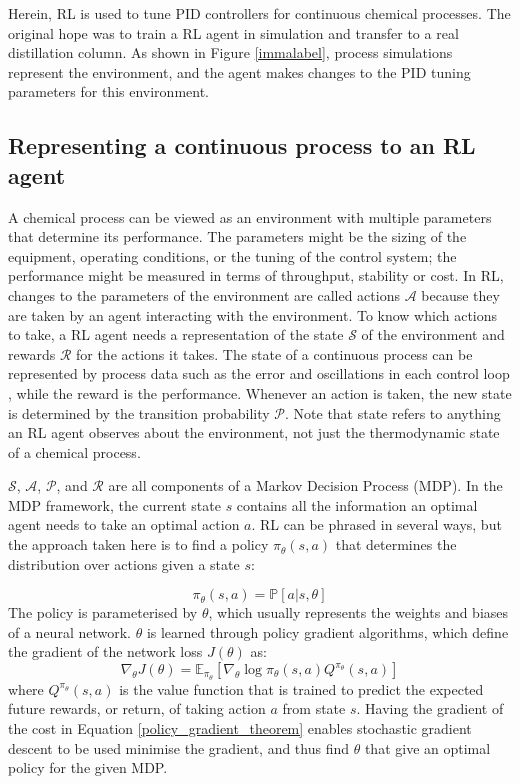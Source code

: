Herein, RL is used to tune PID controllers for continuous chemical processes. The original hope was to train a RL agent in simulation and transfer to a real distillation column. As shown in Figure \ref{immalabel}, process simulations represent the environment, and the agent makes changes to the PID tuning parameters for this environment. 

\subsection{Representing a continuous process to an RL agent}
A chemical process can be viewed as an environment with multiple parameters that determine its performance. The parameters might be the sizing of the equipment, operating conditions, or the tuning of the control system; the performance might be measured in terms of throughput, stability or cost. In RL, changes to the parameters of the environment are called actions $\mathcal A$ because they are taken by an agent interacting with the environment. To know which actions to take, a RL agent needs a representation of the state $\mathcal S$ of the environment and rewards $\mathcal R$ for the actions it takes. The state of a continuous process can be represented by process data such as the error and oscillations in each control loop \cite{Lee2005, Badgwell2019, Shin2019}, while the reward is the performance. Whenever an action is taken, the new state is determined by the transition probability $\mathcal P$. Note that state refers to anything an RL agent observes about the environment, not just the thermodynamic state of a chemical process.

$\mathcal S$, $\mathcal A$, $\mathcal P$, and $\mathcal R$ are all components of a Markov Decision Process (MDP). In the MDP framework, the current state $s$ contains all the information an optimal agent needs to take an optimal action $a$.  RL can be phrased in several ways, but the approach taken here is to find a policy $\pi_{\theta}(s,a)$ that determines the distribution over actions given a state $s$:

\begin{equation}
	\pi_{\theta}(s,a) = \mathbb P[a|s,\theta]
\end{equation}
The policy is parameterised by $\theta$, which usually represents the weights and biases of a neural network. $\theta$ is learned through policy gradient algorithms, which define the gradient of the network loss $J(\theta)$ as:
\begin{equation}
	\label{policy_gradient_theorem}
	\nabla_{\theta}J(\theta) = \mathbb E_{\pi_{\theta}} [\nabla_{\theta} \log \pi_\theta(s,a)Q^{\pi_{\theta}}(s,a)]
\end{equation}
where $Q^{\pi_{\theta}}(s,a)$ is the value function that is trained to predict the expected future rewards, or return, of taking action $a$ from state $s$. Having the gradient of the cost in Equation \ref{policy_gradient_theorem} enables stochastic gradient descent to be used minimise the gradient, and thus find $\theta$ that give an optimal policy for the given MDP.

